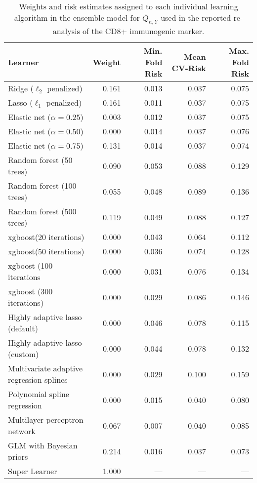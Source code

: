 \begin{table}[H]
\caption{\label{tab:cd8_sl_coefs} Weights and risk estimates assigned to each
  individual learning algorithm in the ensemble model for $\overline{Q}_{n,Y}$
  used in the reported re-analysis of the CD8+ immunogenic marker.}
\centering
\begin{tabular}[t]{l|r|r|r|r}
\hline
Learner & Weight & Min. Fold Risk & Mean CV-Risk & Max. Fold Risk\\
\hline
Ridge ($\ell_2$ penalized) & 0.161 & 0.013 & 0.037 & 0.075\\
\hline
Lasso ($\ell_1$ penalized) & 0.161 & 0.011 & 0.037 & 0.075\\
\hline
Elastic net ($\alpha = 0.25$) & 0.003 & 0.012 & 0.037 & 0.075\\
\hline
Elastic net ($\alpha = 0.50$) & 0.000 & 0.014 & 0.037 & 0.076\\
\hline
Elastic net ($\alpha = 0.75$) & 0.131 & 0.014 & 0.037 & 0.074\\
\hline
Random forest (50 trees) & 0.090 & 0.053 & 0.088 & 0.129\\
\hline
Random forest (100 trees) & 0.055 & 0.048 & 0.089 & 0.136\\
\hline
Random forest (500 trees) & 0.119 & 0.049 & 0.088 & 0.127\\
\hline
xgboost(20 iterations) & 0.000 & 0.043 & 0.064 & 0.112\\
\hline
xgboost(50 iterations) & 0.000 & 0.036 & 0.074 & 0.128\\
\hline
xgboost (100 iterations & 0.000 & 0.031 & 0.076 & 0.134\\
\hline
xgboost (300 iterations) & 0.000 & 0.029 & 0.086 & 0.146\\
\hline
Highly adaptive lasso (default) & 0.000 & 0.046 & 0.078 & 0.115\\
\hline
Highly adaptive lasso (custom) & 0.000 & 0.044 & 0.078 & 0.132\\
\hline
Multivariate adaptive regression splines & 0.000 & 0.029 & 0.100 & 0.159\\
\hline
Polynomial spline regression & 0.000 & 0.015 & 0.040 & 0.080\\
\hline
Multilayer perceptron network & 0.067 & 0.007 & 0.040 & 0.085\\
\hline
GLM with Bayesian priors & 0.214 & 0.016 & 0.037 & 0.073\\
\hline
Super Learner & 1.000 & --- & --- & ---\\
\hline
\end{tabular}
\end{table}
